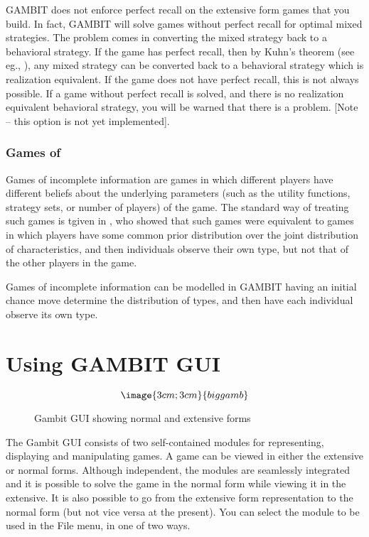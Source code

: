 GAMBIT does not enforce perfect recall on the extensive form games that
you build.  In fact, GAMBIT will solve games without perfect recall for
 optimal
mixed strategies.  The problem comes in converting the mixed strategy back
to a behavioral strategy.  If the game has perfect recall, then by Kuhn's
theorem (see eg., \cite{vanDamme:1983}), any mixed strategy can be
converted back to a behavioral strategy which is realization equivalent.  
If the game does not have perfect recall, this is not always possible.  If
a game without perfect recall is solved, and there is no realization
equivalent behavioral strategy, you will be warned that there is a
problem. [Note -- this option is not yet implemented].  
 

\subsection{Games of }\label{incinfsec}
Games of incomplete information are games in which different players have 
different beliefs about the underlying parameters (such as the utility 
functions, strategy sets, or number of players) of the game.  The standard 
way of treating such games is tgiven in \cite{Harsanyi:1967}, who showed that
 such games were equivalent to games in which players have some common
prior distribution over the joint distribution of characteristics, and
 then individuals observe their own type, but not that of the other players 
in the game.  

Games of incomplete information can be modelled in GAMBIT having an initial 
chance move determine the distribution of types, and then have each 
individual observe its own type.    

\chapter{Using GAMBIT GUI}

\begin{figure}
$$\image{3cm;3cm}{biggamb}$$
\caption{Gambit GUI showing normal and extensive
forms}\label{fig_biggamb}
\end{figure}

The Gambit GUI consists of two self-contained modules for representing,
displaying and manipulating games.  A game can be viewed in either the
extensive or normal forms.  Although independent, the modules are
seamlessly integrated and it is possible to solve the game in the normal
form while viewing it in the extensive.  It is also possible to go from
the extensive form representation to the normal form (but not vice versa
at the present).   You can select the module to be used in the File menu,
in one of two ways.

